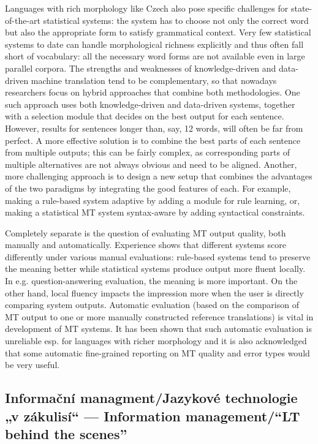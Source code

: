 \documentclass[]{../../metanetpaper}
\begin{document}
\begin{multicols}{2}
Languages with rich morphology like Czech also pose specific challenges for state-of-the-art statistical systems: the system has to choose not only the correct word but also the appropriate form to satisfy grammatical context. Very few statistical systems to date can handle morphological richness explicitly and thus often fall short of vocabulary: all the necessary word forms are not available even in large parallel corpora.
The strengths and weaknesses of knowledge-driven and data-driven machine translation tend to be complementary, so that nowadays researchers focus on hybrid approaches that combine both methodologies. One such approach uses both knowledge-driven and data-driven systems, together with a selection module that decides on the best output for each sentence. However, results for sentences longer than, say, 12 words, will often be far from perfect. A more effective solution is to combine the best parts of each sentence from multiple outputs; this can be fairly complex, as corresponding parts of multiple alternatives are not always obvious and need to be aligned. Another, more challenging approach is to design a new setup that combines the advantages of the two paradigms by integrating the good features of each. For example, making a rule-based system adaptive by adding a module for rule learning, or, making a statistical MT system syntax-aware by adding syntactical constraints.

Completely separate is the question of evaluating MT output quality, both manually and automatically. Experience shows that different systems score differently under various manual evaluations: rule-based systems tend to preserve the meaning better while statistical systems produce output more fluent locally. In e.g. question-answering evaluation, the meaning is more important. On the other hand, local fluency impacts the impression more when the user is directly comparing system outputs. Automatic evaluation (based on the comparison of MT output to one or more manually constructed reference translations) is vital in development of MT systems. It has been shown that such automatic evaluation is unreliable esp. for languages with richer morphology and it is also acknowledged that some automatic fine-grained reporting on MT quality and error types would be very useful.

\subsection{Informační managment/Jazykové technologie „v zákulisí“ --- Information management/``LT behind the scenes''}


\end{multicols}
\end{document}
